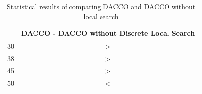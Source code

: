 		\begin{table}[!htdp]
				\begin{center}
					\begin{tabular}{| c | c |}
						\hline
						~ & \multicolumn{1}{p{4cm}|}{\textbf{DACCO - DACCO without Discrete Local Search}} \\ \hline
						30 & > \\ \hline
						38 & > \\ \hline
						45 & > \\ \hline
						50 & < \\ \hline
					\end{tabular}
					\caption{Statistical results of comparing DACCO and DACCO without local search}
					\label{tab:statistical_comparison_discrete_local_search}
				\end{center}
		\end{table}
		
		
		\pagebreak
		
